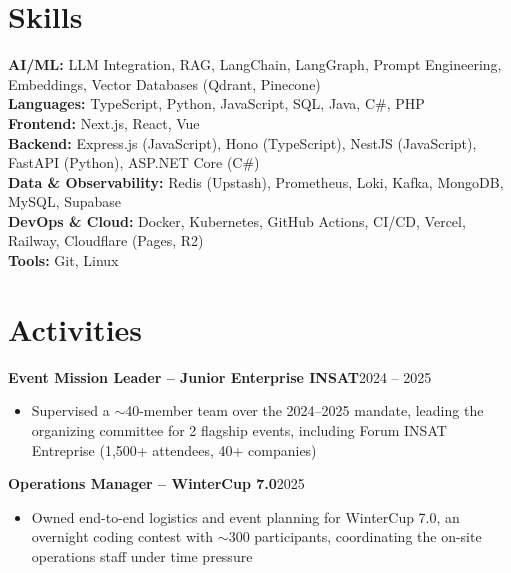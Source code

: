 \documentclass[10pt,a4paper]{article}
\newcommand{\entry}[2]{\vspace{1pt}\noindent\textbf{#1}\hfill{\color{muted}#2}\par}
\begin{document}
\section{Skills}
\textbf{AI/ML:} LLM Integration, RAG, LangChain, LangGraph, Prompt Engineering, Embeddings, Vector Databases (Qdrant, Pinecone)\\
\textbf{Languages:} TypeScript, Python, JavaScript, SQL, Java, C\#, PHP\\
\textbf{Frontend:} Next.js, React, Vue\\
\textbf{Backend:} Express.js (JavaScript), Hono (TypeScript), NestJS (JavaScript), FastAPI (Python), ASP.NET Core (C\#)\\
\textbf{Data \& Observability:} Redis (Upstash), Prometheus, Loki, Kafka, MongoDB, MySQL, Supabase\\
\textbf{DevOps \& Cloud:} Docker, Kubernetes, GitHub Actions, CI/CD, Vercel, Railway, Cloudflare (Pages, R2)\\
\textbf{Tools:} Git, Linux

\section{Activities}
\entry{Event Mission Leader -- Junior Enterprise INSAT}{2024 -- 2025}
\begin{itemize}
  \item Supervised a $\sim$40-member team over the 2024--2025 mandate, leading the organizing committee for 2 flagship events, including Forum INSAT Entreprise (1,500+ attendees, 40+ companies)
\end{itemize}
\entry{Operations Manager -- WinterCup 7.0}{2025}
\begin{itemize}
  \item Owned end-to-end logistics and event planning for WinterCup 7.0, an overnight coding contest with $\sim$300 participants, coordinating the on-site operations staff under time pressure
\end{itemize}
\end{document}
